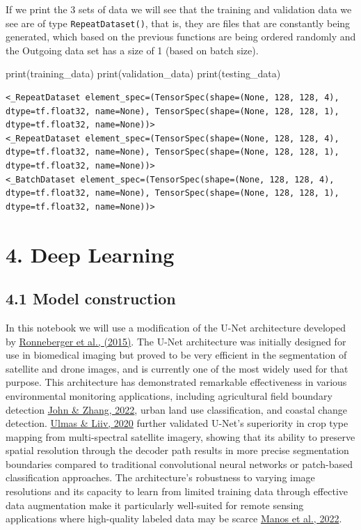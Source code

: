 \documentclass[
  letterpaper,
  DIV=11,
  numbers=noendperiod]{scrreprt}
\newenvironment{Shaded}{\begin{snugshade}}{\end{snugshade}}
\newcommand{\BuiltInTok}[1]{\textcolor[rgb]{0.00,0.23,0.31}{#1}}
\newcommand{\NormalTok}[1]{\textcolor[rgb]{0.00,0.23,0.31}{#1}}
\begin{document}
If we print the 3 sets of data we will see that the training and
validation data we see are of type \texttt{RepeatDataset()}, that is,
they are files that are constantly being generated, which based on the
previous functions are being ordered randomly and the Outgoing data set
has a size of 1 (based on batch size).

\begin{Shaded}
\begin{Highlighting}[]
\BuiltInTok{print}\NormalTok{(training\_data)}
\BuiltInTok{print}\NormalTok{(validation\_data)}
\BuiltInTok{print}\NormalTok{(testing\_data)}
\end{Highlighting}
\end{Shaded}

\begin{verbatim}
<_RepeatDataset element_spec=(TensorSpec(shape=(None, 128, 128, 4), dtype=tf.float32, name=None), TensorSpec(shape=(None, 128, 128, 1), dtype=tf.float32, name=None))>
<_RepeatDataset element_spec=(TensorSpec(shape=(None, 128, 128, 4), dtype=tf.float32, name=None), TensorSpec(shape=(None, 128, 128, 1), dtype=tf.float32, name=None))>
<_BatchDataset element_spec=(TensorSpec(shape=(None, 128, 128, 4), dtype=tf.float32, name=None), TensorSpec(shape=(None, 128, 128, 1), dtype=tf.float32, name=None))>
\end{verbatim}

\section{4. Deep Learning}\label{deep-learning}

\subsection{4.1 Model construction}\label{model-construction}

In this notebook we will use a modification of the U-Net architecture
developed by \href{https://arxiv.org/abs/1505.04597}{Ronneberger et al.,
(2015)}. The U-Net architecture was initially designed for use in
biomedical imaging but proved to be very efficient in the segmentation
of satellite and drone images, and is currently one of the most widely
used for that purpose. This architecture has demonstrated remarkable
effectiveness in various environmental monitoring applications,
including agricultural field boundary detection
\href{https://doi.org/10.1016/j.jag.2022.102685}{John \& Zhang, 2022},
urban land use classification, and coastal change detection.
\href{https://doi.org/10.48550/arXiv.2003.02899}{Ulmas \& Liiv, 2020}
further validated U-Net's superiority in crop type mapping from
multi-spectral satellite imagery, showing that its ability to preserve
spatial resolution through the decoder path results in more precise
segmentation boundaries compared to traditional convolutional neural
networks or patch-based classification approaches. The architecture's
robustness to varying image resolutions and its capacity to learn from
limited training data through effective data augmentation make it
particularly well-suited for remote sensing applications where
high-quality labeled data may be scarce
\href{https://doi.org/10.3390/rs14112719}{Manos et al., 2022}.
\end{document}
